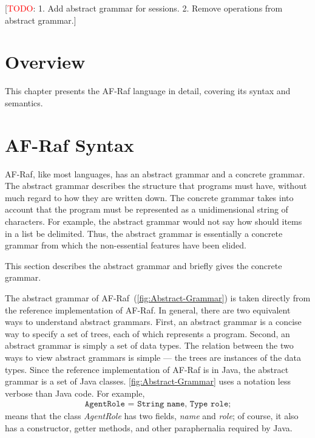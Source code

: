 \documentclass[a4paper,12pt,oneside,fleqn]{book} %
\newcommand{\todo}[1]{[\textcolor{red}{TODO}: #1]}
\begin{document}
\todo{1. Add abstract grammar for sessions. 2. Remove operations from
abstract grammar.}

\section{Overview}\label{sec:langdef.overview} %

This chapter presents the AF-Raf language in detail, covering its syntax
and semantics.

\section{AF-Raf Syntax}\label{sec:langdef.syntax} %

AF-Raf, like most languages, has an abstract grammar and a concrete
grammar. The abstract grammar describes the structure that programs must
have, without much regard to how they are written down. The concrete
grammar takes into account that the program must be represented as a
unidimensional string of characters. For example, the abstract grammar
would not say how should items in a list be delimited. Thus, the abstract
grammar is essentially a concrete grammar from which the non-essential
features have been elided.

This section describes the abstract grammar and briefly gives the concrete
grammar.

The abstract grammar of AF-Raf~(\autoref{fig:Abstract-Grammar}) is taken
directly from the reference implementation of AF-Raf.  In general, there
are two equivalent ways to understand abstract grammars. First, an abstract
grammar is a concise way to specify a set of trees, each of which
represents a program. Second, an abstract grammar is simply a set of data
types. The relation between the two ways to view abstract grammars is
simple --- the trees are instances of the data types. Since the reference
implementation of AF-Raf is in Java, the abstract grammar is a set of Java
classes. \autoref{fig:Abstract-Grammar} uses a notation less verbose than
Java code. For example,
\begin{align}
\texttt{AgentRole = String name, Type role;}
\end{align}
means that the class {\it AgentRole\/} has two fields, {\it name\/} and
{\it role}; of course, it also has a constructor, getter methods, and other
paraphernalia required by Java.
\end{document}
